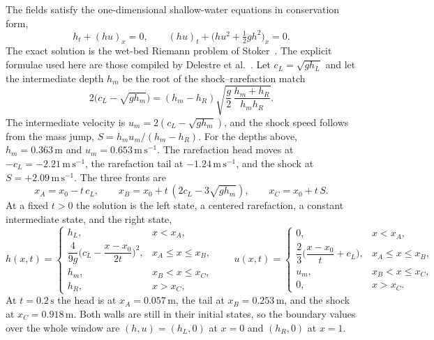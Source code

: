\documentclass[11pt]{article}
\begin{document}
The fields satisfy the one-dimensional shallow-water equations in conservation form,
\begin{equation}
\label{eq:db-pde}
h_{t}+(hu)_{x}=0,
\qquad
(hu)_{t}+\big(hu^{2}+\tfrac12 g h^{2}\big)_{x}=0.
\end{equation}
The exact solution is the wet-bed Riemann problem of Stoker~\cite{stoker1957}. The explicit formulae used here are those compiled by Delestre et al.~\cite{delestre2013}. Let \(c_{L}=\sqrt{g h_{L}}\) and let the intermediate depth \(h_{m}\) be the root of the shock--rarefaction match
\begin{equation}
\label{eq:db-hm}
2\big(c_{L}-\sqrt{g h_{m}}\big)
=
(h_{m}-h_{R})
\sqrt{\frac{g}{2}\,\frac{h_{m}+h_{R}}{h_{m} h_{R}}}.
\end{equation}
The intermediate velocity is \(u_{m}=2(c_{L}-\sqrt{g h_{m}})\), and the shock speed follows from the mass jump, \(S=h_{m} u_{m}/(h_{m}-h_{R})\). For the depths above, \(h_{m}=0.363\,\mathrm{m}\) and \(u_{m}=0.653\,\mathrm{m\,s^{-1}}\). The rarefaction head moves at \(-c_{L}=-2.21\,\mathrm{m\,s^{-1}}\), the rarefaction tail at \(-1.24\,\mathrm{m\,s^{-1}}\), and the shock at \(S=+2.09\,\mathrm{m\,s^{-1}}\). The three fronts are
\begin{equation}
\label{eq:db-fronts}
x_{A}=x_{0}-t\,c_{L},
\qquad
x_{B}=x_{0}+t\,(2c_{L}-3\sqrt{g h_{m}}),
\qquad
x_{C}=x_{0}+t\,S.
\end{equation}
At a fixed \(t>0\) the solution is the left state, a centered rarefaction, a constant intermediate state, and the right state,
\begin{equation}
\label{eq:db-exact}
h(x,t)=
\begin{cases}
h_{L}, & x<x_{A},\\[2pt]
\dfrac{4}{9g}\Big(c_{L}-\dfrac{x-x_{0}}{2t}\Big)^{2}, & x_{A}\le x\le x_{B},\\[8pt]
h_{m}, & x_{B}<x\le x_{C},\\[2pt]
h_{R}, & x>x_{C},
\end{cases}
\qquad
u(x,t)=
\begin{cases}
0, & x<x_{A},\\[2pt]
\dfrac{2}{3}\Big(\dfrac{x-x_{0}}{t}+c_{L}\Big), & x_{A}\le x\le x_{B},\\[8pt]
u_{m}, & x_{B}<x\le x_{C},\\[2pt]
0, & x>x_{C}.
\end{cases}
\end{equation}
At \(t=0.2\,\mathrm{s}\) the head is at \(x_{A}=0.057\,\mathrm{m}\), the tail at \(x_{B}=0.253\,\mathrm{m}\), and the shock at \(x_{C}=0.918\,\mathrm{m}\). Both walls are still in their initial states, so the boundary values over the whole window are \((h,u)=(h_{L},0)\) at \(x=0\) and \((h_{R},0)\) at \(x=1\).
\end{document}
